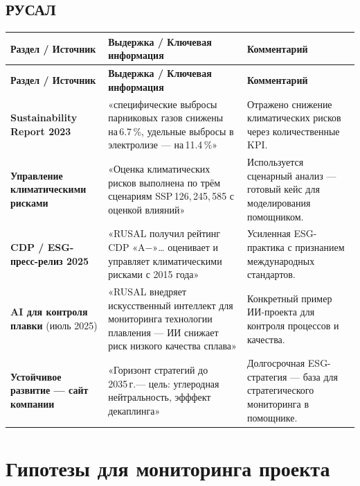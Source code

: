 \documentclass[12pt]{article}
\begin{document}
\subsection{РУСАЛ}
\begin{longtable}{|p{4.5cm}|p{6cm}|p{4.5cm}|}
    \hline
    \textbf{Раздел / Источник} & \textbf{Выдержка / Ключевая информация} & \textbf{Комментарий} \\
    \hline
    \endfirsthead
    \hline
    \textbf{Раздел / Источник} & \textbf{Выдержка / Ключевая информация} & \textbf{Комментарий} \\
    \hline
    \endhead
    
    \textbf{Sustainability Report 2023} &
    «специфические выбросы парниковых газов снижены на 6.7 \%, удельные выбросы в электролизе — на 11.4 \%» &
    Отражено снижение климатических рисков через количественные KPI. \\
    \hline
    
    \textbf{Управление климатическими рисками} &
    «Оценка климатических рисков выполнена по трём сценариям SSP 126, 245, 585 с оценкой влияний» &
    Используется сценарный анализ — готовый кейс для моделирования помощником. \\
    \hline
    
    \textbf{CDP / ESG-пресс-релиз 2025} &
    «RUSAL получил рейтинг CDP «A−»… оценивает и управляет климатическими рисками с 2015 года» &
    Усиленная ESG-практика с признанием международных стандартов. \\
    \hline
    
    \textbf{AI для контроля плавки} (июль 2025) &
    «RUSAL внедряет искусственный интеллект для мониторинга технологии плавления — ИИ снижает риск низкого качества сплава» &
    Конкретный пример ИИ‑проекта для контроля процессов и качества. \\
    \hline
    
    \textbf{Устойчивое развитие — сайт компании} &
    «Горизонт стратегий до 2035 г.— цель: углеродная нейтральность, эфффект декаплинга» &
    Долгосрочная ESG-стратегия — база для стратегического мониторинга в помощнике. \\
    \hline
    
    \end{longtable}

\section{Гипотезы для мониторинга проекта}
\end{document}
